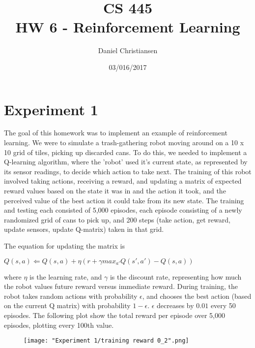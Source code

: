 \documentclass{article}
\title{CS 445 \\ HW 6 - Reinforcement Learning}
\author{Daniel Christiansen}
\date{03/016/2017}
\begin{document}
\maketitle

\clearpage
\section{Experiment 1}


\begin{flushleft}
The goal of this homework was to implement an example of reinforcement learning.  We were to simulate a trash-gathering robot moving around on a 10 x 10 grid of tiles, picking up discarded cans.  To do this, we needed to implement a Q-learning algorithm, where the 'robot' used it's current state, as represented by its sensor readings, to decide which action to take next.  The training of this robot involved taking actions, receiving a reward, and updating a matrix of expected reward values based on the state it was in and the action it took, and the perceived value of the best action it could take from its new state.  The training and testing each consisted of 5,000 episodes, each episode consisting of a newly randomized grid of cans to pick up, and 200 steps (take action, get reward, update sensors, update Q-matrix) taken in that grid.
\end{flushleft}

\begin{flushleft}
The equation for updating the matrix is
\end{flushleft}
$Q(s, a) \Leftarrow Q(s, a) + \eta (r + \gamma max_{a'} Q(s', a') - Q(s, a))$
\begin{flushleft}
where $\eta$ is the learning rate, and $\gamma$ is the discount rate, representing how much the robot values future reward versus immediate reward.  During training, the robot takes random actions with probability $\epsilon$, and chooses the best action (based on the current Q matrix) with probability $1 - \epsilon$.  $\epsilon$ decreases by $0.01$ every 50 episodes.  The following plot show the total reward per episode over 5,000 episodes, plotting every 100th value.
\end{flushleft}

\clearpage

\begin{figure}[h!]
    \noindent\texttt{[image: "Experiment 1/training reward 0\_2".png]}
\end{figure}
\end{document}
